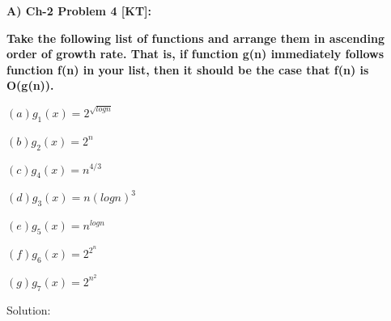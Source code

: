 \documentclass[letterpaper,portrait,12pt]{article}
\begin{document}
\begin{flushleft}

\end{flushleft}


\begin{flushleft}
\textbf{A) Ch-2 Problem 4 [KT]:}
\end{flushleft}


\begin{flushleft}
\textbf{	Take the following list of functions and arrange them in ascending order of growth rate. That is, if function g(n) immediately follows function f(n) in your list, then it should be the case that f(n) is O(g(n)).}
\end{flushleft}


\begin{flushleft}

\end{flushleft}


\begin{flushleft}
$(a)g_1(x)=2^\sqrt{logn} 
$
\end{flushleft}


\begin{flushleft}
$(b)g_2(x)=2^n 
$
\end{flushleft}


\begin{flushleft}
$(c)g_4(x)=n^{4/3}



$
\end{flushleft}


\begin{flushleft}
$(d)g_3(x)=n(logn)^3$
\end{flushleft}


\begin{flushleft}
$(e)g_5(x)=n^{logn}
$
\end{flushleft}


\begin{flushleft}
$(f)g_6(x)=2^{2^{n}}$
\end{flushleft}


\begin{flushleft}
$(g)g_7(x)=2^{n^{2}}$
\end{flushleft}


\begin{flushleft}

\end{flushleft}


\begin{flushleft}
Solution:
\end{flushleft}
\end{document}
